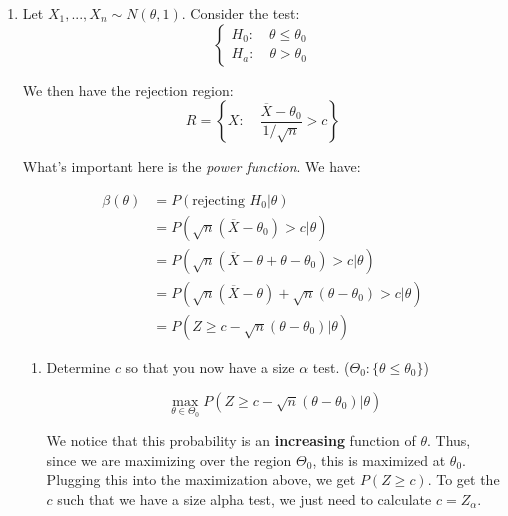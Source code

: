 \documentclass{article}
\begin{document}
    \begin{enumerate}
        \item Let $X_1,...,X_n \sim N(\theta,1)$. Consider the test:
        \begin{equation*}
            \begin{cases}
                H_0: \quad \theta \leq \theta_0\\
                H_a: \quad \theta > \theta_0
            \end{cases}
        \end{equation*}
        
        We then have the rejection region:
        \begin{equation*}
            R = \left\{ X: \quad \frac{\overline{X} - \theta_0}{1/\sqrt{n}} > c \right\}
        \end{equation*}
        
        What's important here is the \textit{power function}. We have:
        
        \begin{equation*}
            \begin{split}
                \beta(\theta) &= P(\text{rejecting } H_0 | \theta)\\
                            &= P(\sqrt{n}(\overline{X}-\theta_0) > c | \theta)\\
                            &= P(\sqrt{n}(\overline{X} - \theta + \theta - \theta_0) > c | \theta)\\
                            &= P(\sqrt{n}(\overline{X}-\theta) + \sqrt{n}(\theta-\theta_0) > c | \theta)\\
                            &= P(Z \geq c - \sqrt{n}(\theta - \theta_0) | \theta)
            \end{split}
        \end{equation*}
        
        \begin{enumerate}
            \item Determine $c$ so that you now have a size $\alpha$ test. ($\Theta_0: \{\theta \leq \theta_0 \}$)
            
            \begin{equation*}
                \max_{\theta\in\Theta_0} P\left( Z \geq c - \sqrt{n}(\theta - \theta_0) | \theta \right)
            \end{equation*}
            
            We notice that this probability is an \textbf{increasing} function of $\theta$. Thus, since we are maximizing over the region $\Theta_0$, this is maximized at $\theta_0$. Plugging this into the maximization above, we get $P(Z \geq c)$. To get the $c$ such that we have a size alpha test, we just need to calculate $c = Z_\alpha$.
            

\end{enumerate}
\end{enumerate}
\end{document}
